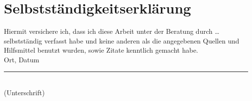 	\section*{Selbstständigkeitserklärung}
	Hiermit versichere ich, dass ich diese Arbeit unter der Beratung durch … selbstständig verfasst habe und keine anderen als die angegebenen Quellen und Hilfsmittel benutzt wurden, sowie Zitate kenntlich gemacht habe. \\[2cm]
	
	Ort, Datum \hfill \rule{5cm}{0.4pt} \\
	\hfill (Unterschrift)
	

